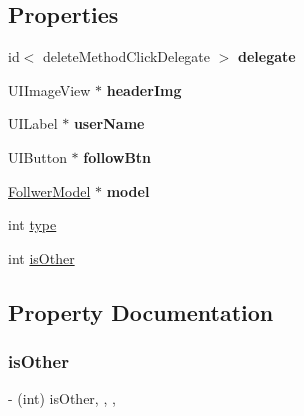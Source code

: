\subsection*{Properties}
\begin{DoxyCompactItemize}
\item 
\mbox{\label{interface_follwer_cell_a0434851a3cacb0913d3efb3cdec460f4}} 
id$<$ delete\+Method\+Click\+Delegate $>$ {\bfseries delegate}
\item 
\mbox{\label{interface_follwer_cell_aca0f64df3f7999737527f3cf521819d3}} 
U\+I\+Image\+View $\ast$ {\bfseries header\+Img}
\item 
\mbox{\label{interface_follwer_cell_ac3b71f5e51c62de37d47a63d656bccfa}} 
U\+I\+Label $\ast$ {\bfseries user\+Name}
\item 
\mbox{\label{interface_follwer_cell_a7741fe78369040af5c8de47048e7c899}} 
U\+I\+Button $\ast$ {\bfseries follow\+Btn}
\item 
\mbox{\label{interface_follwer_cell_ab82e146b4544e675d4a2925180ee5f7d}} 
\mbox{\hyperlink{interface_follwer_model}{Follwer\+Model}} $\ast$ {\bfseries model}
\item 
int \mbox{\hyperlink{interface_follwer_cell_adde63249dd1767cd890059e3614016c1}{type}}
\item 
int \mbox{\hyperlink{interface_follwer_cell_a5f06471b913d8e6d7c138e7aa484cfe8}{is\+Other}}
\end{DoxyCompactItemize}


\subsection{Property Documentation}
\mbox{\label{interface_follwer_cell_a5f06471b913d8e6d7c138e7aa484cfe8}} 
\subsubsection{\texorpdfstring{is\+Other}{isOther}}
{\footnotesize\ttfamily -\/ (int) is\+Other\hspace{0.3cm}{\ttfamily [read]}, {\ttfamily [write]}, {\ttfamily [nonatomic]}, {\ttfamily [assign]}}

